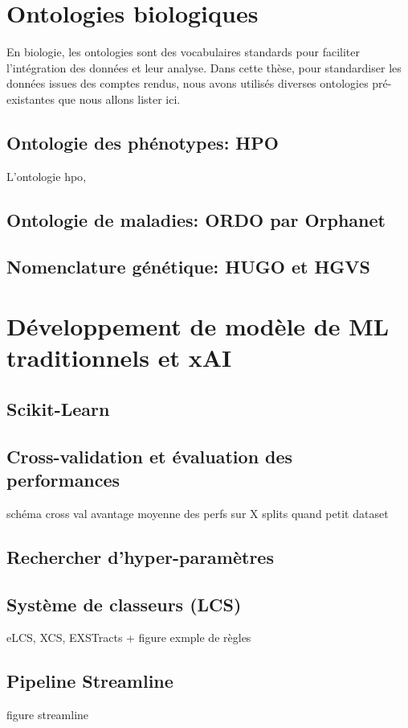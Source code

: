 \section{Ontologies biologiques}
En biologie, les ontologies sont des vocabulaires standards pour faciliter l'intégration des données et leur analyse. Dans cette thèse, pour standardiser les données issues des comptes rendus, nous avons utilisés diverses ontologies pré-existantes que nous allons lister ici.

\subsection{Ontologie des phénotypes: HPO}
L'ontologie \gls{hpo}, 
\subsection{Ontologie de maladies: ORDO par Orphanet}
\subsection{Nomenclature génétique: HUGO et HGVS}

\section{Développement de modèle de ML traditionnels et xAI}
\subsection{Scikit-Learn}
\subsection{Cross-validation et évaluation des performances}
schéma cross val avantage moyenne des perfs sur X splits quand petit dataset

\subsection{Rechercher d'hyper-paramètres}
\subsection{Système de classeurs (LCS)}
eLCS, XCS, EXSTracts + figure exmple de règles
\subsection{Pipeline Streamline}
figure streamline
